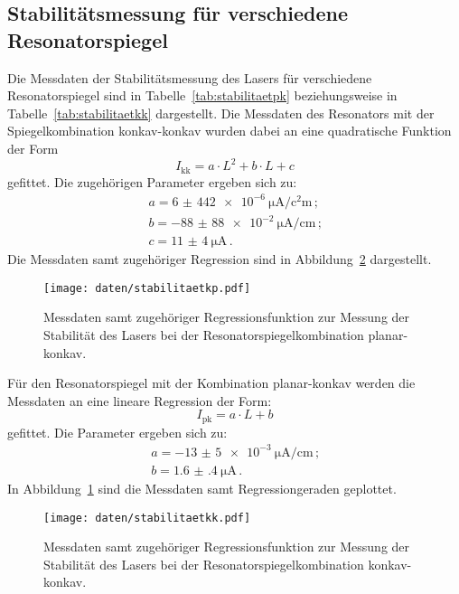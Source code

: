 \subsection{Stabilitätsmessung für verschiedene Resonatorspiegel}
Die Messdaten der Stabilitätsmessung des Lasers für verschiedene Resonatorspiegel sind in Tabelle~\ref{tab:stabilitaetpk} beziehungsweise in Tabelle~\ref{tab:stabilitaetkk} dargestellt.
Die Messdaten des Resonators mit der Spiegelkombination konkav-konkav wurden dabei an eine quadratische Funktion der Form
\begin{equation}
  I_{\text{kk}}=a\cdot L^2+b\cdot L+c
\end{equation}
gefittet.
Die zugehörigen Parameter ergeben sich zu:
\begin{align}
  a=\SI{6(442)e-6}{\micro\ampere\per\square\centi\meter}\,\text{;}\\
  b=-\SI{88(88)e-2}{\micro\ampere\per\centi\meter} \,\text{;}\\
  c=\SI{11(4)}{\micro\ampere}\,\text{.}
\end{align}
Die Messdaten samt zugehöriger Regression sind in Abbildung~\ref{fig:kk} dargestellt.
\begin{figure}
  \centering
  \texttt{[image: daten/stabilitaetkp.pdf]}
  \caption{Messdaten samt zugehöriger Regressionsfunktion zur Messung der Stabilität des Lasers bei der Resonatorspiegelkombination planar-konkav.}
  \label{fig:pk}
\end{figure}

Für den Resonatorspiegel mit der Kombination planar-konkav werden die Messdaten an eine lineare Regression der Form:
\begin{equation}
  I_{\text{pk}}=a\cdot L+b
\end{equation}
gefittet.
Die Parameter ergeben sich zu:
\begin{align}
    a=-\SI{13(5)e-3}{\micro\ampere\per\centi\meter}\,\text{;}\\
  b=\SI{1.6(4)}{\micro\ampere}\,\text{.}
\end{align}
In Abbildung~\ref{fig:pk} sind die Messdaten samt Regressiongeraden geplottet.

\begin{figure}
  \centering
  \texttt{[image: daten/stabilitaetkk.pdf]}
  \caption{Messdaten samt zugehöriger Regressionsfunktion zur Messung der Stabilität des Lasers bei der Resonatorspiegelkombination konkav-konkav.}
  \label{fig:kk}
\end{figure}

